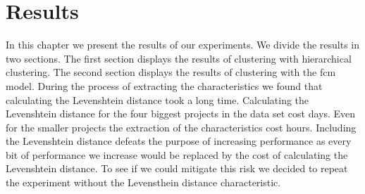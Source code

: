 \documentclass[../main]{subfiles}
\begin{document}
\chapter{Results}
\label{ch:results}
In this chapter we present the results of our experiments.
We divide the results in two sections. 
The first section displays the results of clustering with hierarchical clustering.
The second section displays the results of clustering with the \acrshort{fcm} model.
\newline
During the process of extracting the characteristics we found that calculating the Levenshtein distance took a long time.
Calculating the Levenshtein distance for the four biggest projects in the data set cost days.
Even for the smaller projects the extraction of the characteristics cost hours.
Including the Levenshtein distance defeats the purpose of increasing performance as every bit of performance we increase would be replaced by the cost of calculating the Levenshtein distance.
To see if we could mitigate this risk we decided to repeat the experiment without the Levensthein distance characteristic.




\end{document}
